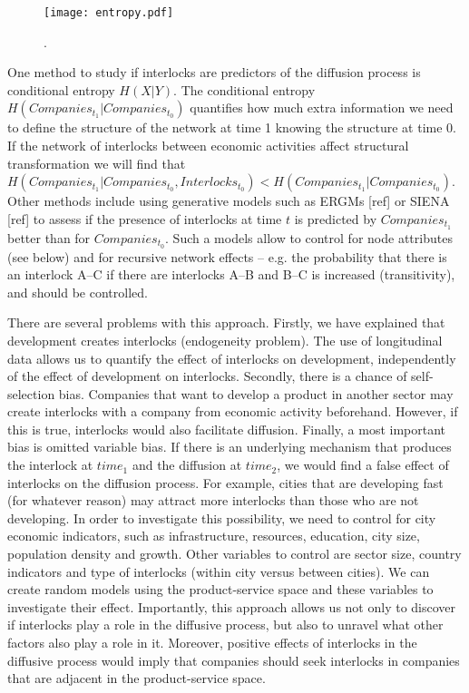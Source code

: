 \begin{figure}
\begin{center}
\texttt{[image: entropy.pdf]}
\caption{.}
\label{fig:entropy}
\end{center}
\end{figure}

One method to study if interlocks are predictors of the diffusion process is conditional entropy $H(X|Y)$.
The conditional entropy  $H(Companies_{t_1}|Companies_{t_0})$ quantifies how much extra information we need to define the structure of the network at time 1 knowing the structure at time 0. 
If the network of interlocks between economic activities affect structural transformation we will find that $H(Companies_{t_1}|Companies_{t_0},Interlocks_{t_0}) < H(Companies_{t_1}|Companies_{t_0})$.
Other methods include using generative models such as ERGMs [ref] or SIENA [ref] to assess if the presence of interlocks at time $t$ is predicted by $Companies_{t_1}$
better than for $Companies_{t_0}$.
Such a models allow to control for node attributes (see below) and for recursive network effects 
-- e.g. the probability that there is an interlock A--C if there are interlocks A--B and B--C is increased (transitivity), and should be controlled.

There are several problems with this approach.
Firstly, we have explained that development creates interlocks (endogeneity problem).
The use of longitudinal data allows us to quantify the effect of interlocks on development,
independently of the effect of development on interlocks.
Secondly, there is a chance of self-selection bias.
Companies that want to develop a product in another sector may create interlocks with a company from economic activity beforehand.
However, if this is true, interlocks would also facilitate diffusion.
Finally, a most important bias is omitted variable bias.
If there is an underlying mechanism that produces the interlock at $time_1$ and the diffusion at $time_2$, 
we would find a false effect of interlocks on the diffusion process.
For example, cities that are developing fast (for whatever reason) may attract more interlocks than those who are not developing.
In order to investigate this possibility, we need to control for city economic indicators, such as infrastructure, resources, education, city size, population density and growth.
Other variables to control are sector size, country indicators and type of interlocks (within city versus between cities).
We can create random models using the product-service space and these variables to investigate their effect.
Importantly, this approach allows us not only to discover if interlocks play a role in the diffusive process, 
but also to unravel what other factors also play a role in it.
Moreover, positive effects of interlocks in the diffusive process would imply that companies should seek interlocks in companies that are adjacent in the product-service space.



